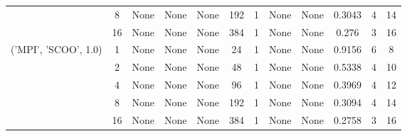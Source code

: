 \begin{tabular}{cccccccccccc}
& 8& None& None& None& 192& 1& None& None& 0.3043& 4& 14\\
& 16& None& None& None& 384& 1& None& None& 0.276& 3& 16\\
\hline
\multirow{5}{*}{('MPI', 'SCOO', 1.0)}& 1& None& None& None& 24& 1& None& None& 0.9156& 6& 8\\
& 2& None& None& None& 48& 1& None& None& 0.5338& 4& 10\\
& 4& None& None& None& 96& 1& None& None& 0.3969& 4& 12\\
& 8& None& None& None& 192& 1& None& None& 0.3094& 4& 14\\
& 16& None& None& None& 384& 1& None& None& 0.2758& 3& 16\\
\hline
\end{tabular}
